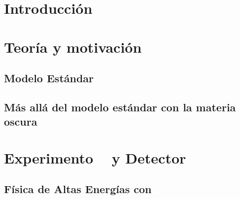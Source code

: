 \documentclass[12pt]{report}
\begin{document}
\setcounter{page}{1}
\tableofcontents
\clearpage
\listoftables
{}
\clearpage
\listoffigures
{}
\clearpage




\chapter*{Introducción}




\chapter{Teoría y motivación}


	\section{Modelo Estándar} 	
	

	\section{M\'as all\'a del modelo est\'andar con la materia oscura}
	
	
				


\chapter{Experimento \LHC ~ y Detector \CMS}

		
	\section{Física de Altas Energías con \LHC}
	
	
\end{document}
